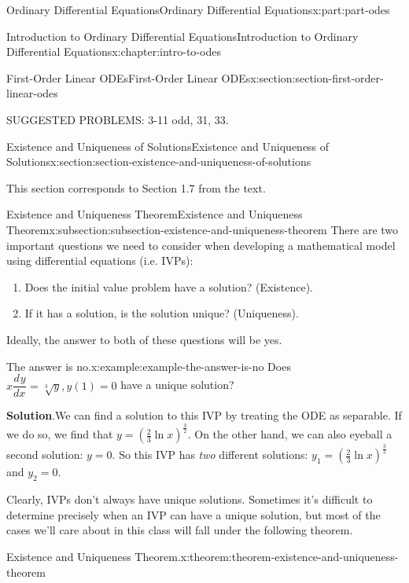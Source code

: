\documentclass[twoside,10pt,]{book}
\newcommand{\blocktitlefont}{\relax}
\numberwithin{equation}{part}
\providecommand{\dv}[3][]{\dfrac{d^{#1} #2}{d #3^{#1}}}
\begin{document}
\begin{partptx}{Ordinary Differential Equations}{}{Ordinary Differential Equations}{}{}{x:part:part-odes}
\begin{chapterptx}{Introduction to Ordinary Differential Equations}{}{Introduction to Ordinary Differential Equations}{}{}{x:chapter:intro-to-odes}
\begin{sectionptx}{First-Order Linear ODEs}{}{First-Order Linear ODEs}{}{}{x:section:section-first-order-linear-odes}
\begin{conclusion}{}
SUGGESTED PROBLEMS: 3-11 odd, 31, 33.%
\end{conclusion}%
\end{sectionptx}
%
%
\typeout{************************************************}
\typeout{************************************************}
%
\begin{sectionptx}{Existence and Uniqueness of Solutions}{}{Existence and Uniqueness of Solutions}{}{}{x:section:section-existence-and-uniqueness-of-solutions}
\begin{introduction}{}%
This section corresponds to Section 1.7 from the text.%
\end{introduction}%
%
%
\typeout{************************************************}
\typeout{************************************************}
%
\begin{subsectionptx}{Existence and Uniqueness Theorem}{}{Existence and Uniqueness Theorem}{}{}{x:subsection:subsection-existence-and-uniqueness-theorem}
There are two important questions we need to consider when developing a mathematical model using differential equations (i.e. IVPs):%
\begin{enumerate}
\item{}Does the initial value problem have a solution? (Existence).%
\item{}If it has a solution, is the solution unique? (Uniqueness).%
\end{enumerate}
Ideally, the answer to both of these questions will be yes.%
\begin{example}{The answer is no.}{x:example:example-the-answer-is-no}%
Does \(x\dv{y}{x} = \sqrt[3]{y},y(1) = 0\) have a unique solution?%
\par\smallskip%
\noindent\textbf{\blocktitlefont Solution}.\hypertarget{g:solution:idp105548816463008}{}\quad{}We can find a solution to this IVP by treating the ODE as separable. If we do so, we find that \(y = \left(\frac{2}{3}\ln x\right)^{\frac{3}{2}}\). On the other hand, we can also eyeball a second solution: \(y=0\). So this IVP has \emph{two} different solutions: \(y_{1} = \left(\frac{2}{3}\ln x\right)^{\frac{3}{2}}\) and \(y_{2} = 0\).%
\end{example}
Clearly, IVPs don't always have unique solutions. Sometimes it's difficult to determine precisely when an IVP can have a unique solution, but most of the cases we'll care about in this class will fall under the following theorem.%
\begin{theorem}{Existence and Uniqueness Theorem.}{}{x:theorem:theorem-existence-and-uniqueness-theorem}%

\end{theorem}
\end{subsectionptx}
\end{sectionptx}
\end{chapterptx}
\end{partptx}
\end{document}
